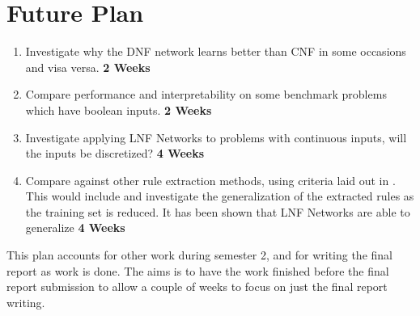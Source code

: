 \chapter{Future Plan}\label{C:futureplan}

\begin{enumerate}
\item Investigate why the DNF network learns better than CNF in some occasions and visa versa. \textbf{2 Weeks}
\item Compare performance and interpretability on some benchmark problems which have boolean inputs. \textbf{2 Weeks}
\item Investigate applying LNF Networks to problems with continuous inputs, will the inputs be discretized? \textbf{4 Weeks}
\item Compare against other rule extraction methods, using criteria laid out in \cite{andrews1995survey}. This would include  and investigate the generalization of the extracted rules as the training set is reduced. It has been shown that LNF Networks are able to generalize \textbf{4 Weeks}
\end{enumerate}

This plan accounts for other work during semester 2, and for writing the final report as work is done. The aims is to have the work finished before the final report submission to allow a couple of weeks to focus on just the final report writing.
